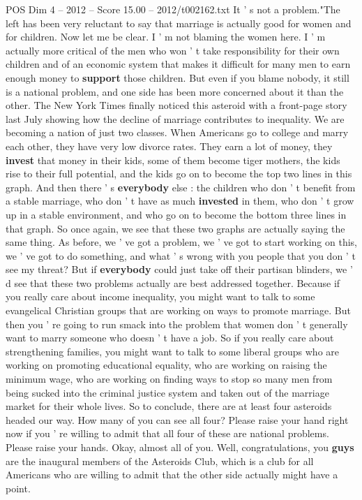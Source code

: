 \begin{textsample}{POS Dim 4 – 2012 – Score 15.00 – 2012/t002162.txt}
It ' s not a problem."The left has been very reluctant to say that marriage is actually good for women and for children.
Now let me be clear.
I ' m not blaming the women here.
I ' m actually more critical of the men who won ' t take responsibility for their own children and of an economic system that makes it difficult for many men to earn enough money to \textbf{support} those children.
But even if you blame nobody, it still is a national problem, and one side has been more concerned about it than the other.
The New York Times finally noticed this asteroid with a front-page story last July showing how the decline of marriage contributes to inequality.
We are becoming a nation of just two classes.
When Americans go to college and marry each other, they have very low divorce rates.
They earn a lot of money, they \textbf{invest} that money in their kids, some of them become tiger mothers, the kids rise to their full potential, and the kids go on to become the top two lines in this graph.
And then there ' s \textbf{everybody} else : the children who don ' t benefit from a stable marriage, who don ' t have as much \textbf{invested} in them, who don ' t grow up in a stable environment, and who go on to become the bottom three lines in that graph.
So once again, we see that these two graphs are actually saying the same thing.
As before, we ' ve got a problem, we ' ve got to start working on this, we ' ve got to do something, and what ' s wrong with you people that you don ' t see my threat?
But if \textbf{everybody} could just take off their partisan blinders, we ' d see that these two problems actually are best addressed together.
Because if you really care about income inequality, you might want to talk to some evangelical Christian groups that are working on ways to promote marriage.
But then you ' re going to run smack into the problem that women don ' t generally want to marry someone who doesn ' t have a job.
So if you really care about strengthening families, you might want to talk to some liberal groups who are working on promoting educational equality, who are working on raising the minimum wage, who are working on finding ways to stop so many men from being sucked into the criminal justice system and taken out of the marriage market for their whole lives.
So to conclude, there are at least four asteroids headed our way.
How many of you can see all four?
Please raise your hand right now if you ' re willing to admit that all four of these are national problems.
Please raise your hands.
Okay, almost all of you.
Well, congratulations, you \textbf{guys} are the inaugural members of the Asteroids Club, which is a club for all Americans who are willing to admit that the other side actually might have a point.

\end{textsample}
